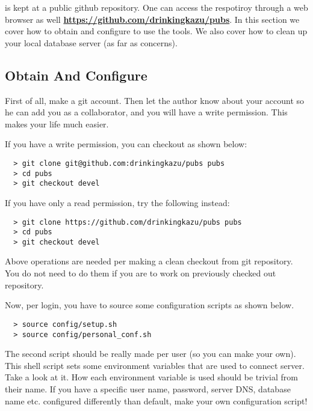 
{\pubs} is kept at a public github repository. One can access the respotiroy
through a web browser as well
\href{https://github.com/drinkingkazu/pubs}{\color{blue}\bf https://github.com/drinkingkazu/pubs}.
In this section we cover how to obtain {\pubs} and configure to use the tools.
We also cover how to clean up your local database server (as far as {\pubs} concerns).

\subsection{Obtain And Configure {\pubs}}

First of all, make a git account. Then let the author know about your account so he
can add you as a collaborator, and you will have a write permission. This makes your
life much easier.

If you have a write permission, you can checkout as shown below:
\begin{lstlisting}
  > git clone git@github.com:drinkingkazu/pubs pubs
  > cd pubs
  > git checkout devel
\end{lstlisting}
If you have only a read permission, try the following instead:
\begin{lstlisting}
  > git clone https://github.com/drinkingkazu/pubs pubs
  > cd pubs
  > git checkout devel
\end{lstlisting}
Above operations are needed per making a clean checkout from git repository.
You do not need to do them if you are to work on previously checked out repository.

Now, per login, you have to source some configuration scripts as shown below.
\begin{lstlisting}
  > source config/setup.sh
  > source config/personal_conf.sh
\end{lstlisting}
The second script should be really made per user (so you can make your own).
This shell script sets some environment variables that are used to connect
{\psql} server. Take a look at it. How each environment variable is used 
should be trivial from their name. If you have a specific user name, password,
server DNS, database name etc. configured differently than default, make
your own configuration script!

